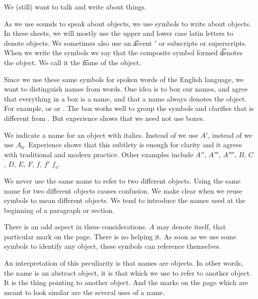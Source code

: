 

We (still) want to talk and write about things.


As we use sounds to speak about objects, we use symbols to write about objects.
In these sheets, we will mostly use the upper and lower case latin letters to denote objects.
We sometimes also use an \t{accent} $'$ or subscripts or superscripts.
When we write the symbols we say that the composite symbol formed \t{denotes} the object.
We call it the \t{name} of the object.

Since we use these same symbols for spoken words of the English language, we want to distinguish names from words.
One idea is to box our names, and agree that everything in a box is a name, and that a name always denotes the object.
For example,  or  or .
The box works well to group the symbols and clarifies that  is different from .
But experience shows that we need not use boxes.

We indicate a name for an object with italics.
Instead of  we use $A'$, instead of  we use $A_0$.
Experience shows that this subtlety is enough for clarity and it agrees with traditional and modern practice.
Other examples include $A''$, $A'''$, $A''''$, $B$, $C$, $D$, $E$, $F$, $f$, $f'$ $f_a$.



We never use the same name to refer to two different objects.
Using the same name for two different objects causes confusion.
We make clear when we reuse symbols to mean different objects.
We tend to introduce the names used at the beginning of a paragraph or section.


There is an odd aspect in these considerations.
$A$ may denote itself, that particular mark on the page.
There is no helping it.
As soon as we use some symbols to identify any object, these symbols can reference themselves.

An interpretation of this peculiarity is that names are objects.
In other words, the name is an abstract object, it is that which we use to refer to another object.
It is the thing pointing to another object.
And the marks on the page which are meant to look similar are the several uses of a name.

